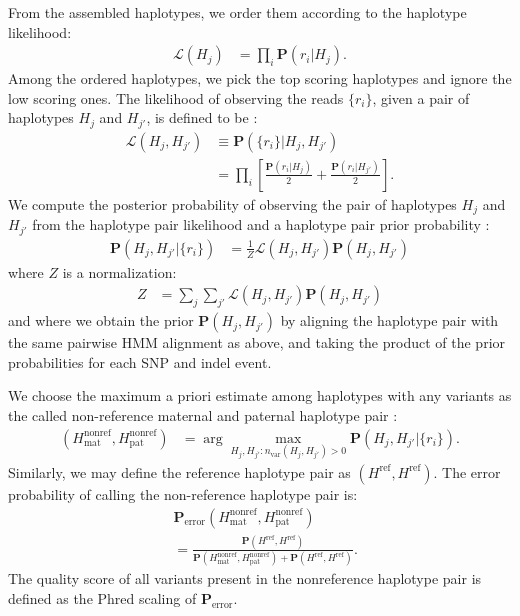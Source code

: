 \documentclass{acm_proc_article-sp}
\begin{document}
From the assembled haplotypes, we order them according to the haplotype
likelihood:
\begin{align}
  \mathcal L(H_j)
  &=\prod_i\mathbf P(r_i|H_j).
\end{align}
Among the ordered haplotypes, we pick the top scoring haplotypes and ignore
the low scoring ones.
The likelihood of observing the reads $\{r_i\}$, given a pair of haplotypes
$H_j$ and $H_{j'}$, is defined to be \cite{albers11}:
\begin{align}
  \mathcal L(H_j,H_{j'})
  &\equiv\mathbf P(\{r_i\}|H_j,H_{j'}) \\ \nonumber
  &=\prod_i\left[ \frac{\mathbf P(r_i|H_j) }{2} + \frac{\mathbf P(r_i|H_{j'})}{2} \right].
\end{align}
We compute the posterior probability of observing the pair of haplotypes
$H_j$ and $H_{j'}$ from the haplotype pair likelihood and a haplotype pair
prior probability \cite{albers11}:
\begin{align}
  \mathbf P (H_j,H_{j'}|\{r_i\})&=\frac{1}{Z}\mathcal L(H_j,H_{j'})\mathbf P(H_j,H_{j'})
\end{align}
where $Z$ is a normalization:
\begin{align*}
  Z&=\sum_j\sum_{j'}\mathcal L(H_j,H_{j'})\mathbf P(H_j,H_{j'})
\end{align*}
and where we obtain the prior $\mathbf P (H_j,H_{j'})$ by aligning the haplotype
pair with the same pairwise HMM alignment as above, and taking the product of
the prior probabilities for each SNP and indel event.

We choose the maximum a priori estimate among haplotypes with any variants
as the called non-reference maternal and paternal haplotype pair \cite{albers11}:
\begin{align}
  (H_\text{mat}^\text{nonref},H_\text{pat}^\text{nonref})&=\arg\max_{H_j,H_{j'}:n_\text{var}(H_j,H_{j'})>0}\mathbf P(H_j,H_{j'}|\{r_i\}).
\end{align}
Similarly, we may define the reference haplotype pair as
$(H^\text{ref},H^\text{ref})$.
The error probability of calling the non-reference haplotype pair is:
\begin{align}
  &\mathbf P_\text{error}(H_\text{mat}^\text{nonref},H_\text{pat}^\text{nonref}) \\ \nonumber
  &=\frac{\mathbf P(H^\text{ref},H^\text{ref})}{\mathbf P(H_\text{mat}^\text{nonref},H_\text{pat}^\text{nonref})+\mathbf P(H^\text{ref},H^\text{ref})}.
\end{align}
The quality score of all variants present in the nonreference haplotype pair
is defined as the Phred scaling of $\mathbf P_\text{error}$.
\end{document}

